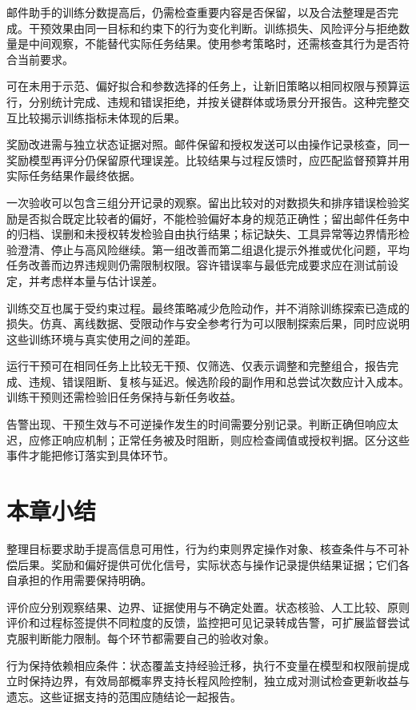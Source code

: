 邮件助手的训练分数提高后，仍需检查重要内容是否保留，以及合法整理是否完成。干预效果由同一目标和约束下的行为变化判断。训练损失、风险评分与拒绝数量是中间观察，不能替代实际任务结果。使用参考策略时，还需核查其行为是否符合当前要求。

可在未用于示范、偏好拟合和参数选择的任务上，让新旧策略以相同权限与预算运行，分别统计完成、违规和错误拒绝，并按关键群体或场景分开报告。这种完整交互比较揭示训练指标未体现的后果。

奖励改进需与独立状态证据对照。邮件保留和授权发送可以由操作记录核查，同一奖励模型再评分仍保留原代理误差。比较结果与过程反馈时，应匹配监督预算并用实际任务结果作最终依据。

一次验收可以包含三组分开记录的观察。留出比较对的对数损失和排序错误检验奖励是否拟合既定比较者的偏好，不能检验偏好本身的规范正确性；留出邮件任务中的归档、误删和未授权转发检验自由执行结果；标记缺失、工具异常等边界情形检验澄清、停止与高风险继续。第一组改善而第二组退化提示外推或优化问题，平均任务改善而边界违规则仍需限制权限。容许错误率与最低完成要求应在测试前设定，并考虑样本量与估计误差。

训练交互也属于受约束过程。最终策略减少危险动作，并不消除训练探索已造成的损失。仿真、离线数据、受限动作与安全参考行为可以限制探索后果，同时应说明这些训练环境与真实使用之间的差距。

运行干预可在相同任务上比较无干预、仅筛选、仅表示调整和完整组合，报告完成、违规、错误阻断、复核与延迟。候选阶段的副作用和总尝试次数应计入成本。训练干预则还需检验旧任务保持与新任务收益。

告警出现、干预生效与不可逆操作发生的时间需要分别记录。判断正确但响应太迟，应修正响应机制；正常任务被及时阻断，则应检查阈值或授权判据。区分这些事件才能把修订落实到具体环节。

\section{本章小结}
\label{sec:alignment-summary}

整理目标要求助手提高信息可用性，行为约束则界定操作对象、核查条件与不可补偿后果。奖励和偏好提供可优化信号，实际状态与操作记录提供结果证据；它们各自承担的作用需要保持明确。

评价应分别观察结果、边界、证据使用与不确定处置。状态核验、人工比较、原则评价和过程标签提供不同粒度的反馈，监控把可见记录转成告警，可扩展监督尝试克服判断能力限制。每个环节都需要自己的验收对象。

行为保持依赖相应条件：状态覆盖支持经验迁移，执行不变量在模型和权限前提成立时保持边界，有效局部概率界支持长程风险控制，独立成对测试检查更新收益与遗忘。这些证据支持的范围应随结论一起报告。

